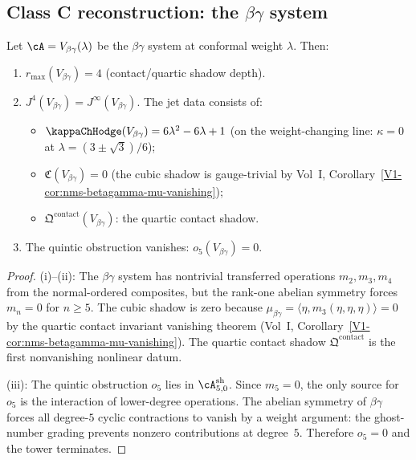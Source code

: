 \subsection{Class C reconstruction: the $\beta\gamma$ system}

\begin{theorem}
\label{thm:class-c-reconstruction}
Let $\cA = V_{\beta\gamma}(\lambda)$ be the $\beta\gamma$ system at conformal weight
$\lambda$. Then:
\begin{enumerate}[label=\textup{(\roman*)}]
\item $r_{\max}(V_{\beta\gamma}) = 4$ (contact/quartic shadow depth).
\item $J^4(V_{\beta\gamma}) = J^\infty(V_{\beta\gamma})$. The jet data consists of:
 \begin{itemize}
 \item $\kappaChHodge(V_{\beta\gamma}) = 6\lambda^2 - 6\lambda + 1$ (on the weight-changing
 line: $\kappa = 0$ at $\lambda = (3 \pm \sqrt{3})/6$);
 \item $\mathfrak{C}(V_{\beta\gamma}) = 0$ (the cubic shadow is gauge-trivial by
 Vol~I, Corollary~\ref*{V1-cor:nms-betagamma-mu-vanishing});
 \item $\mathfrak{Q}^{\mathrm{contact}}(V_{\beta\gamma})$: the quartic contact shadow.
 \end{itemize}
\item The quintic obstruction vanishes: $o_5(V_{\beta\gamma}) = 0$.
\end{enumerate}
\end{theorem}

\begin{proof}
(i)--(ii): The $\beta\gamma$ system has nontrivial transferred operations
$m_2, m_3, m_4$ from the normal-ordered composites, but the rank-one abelian symmetry
forces $m_n = 0$ for $n \geq 5$. The cubic shadow is zero because
$\mu_{\beta\gamma} = \langle \eta, m_3(\eta, \eta, \eta) \rangle = 0$ by the quartic
contact invariant vanishing theorem (Vol~I, Corollary~\ref*{V1-cor:nms-betagamma-mu-vanishing}).
The quartic contact shadow $\mathfrak{Q}^{\mathrm{contact}}$ is the first nonvanishing
nonlinear datum.

(iii): The quintic obstruction $o_5$ lies in $\cA^{\mathrm{sh}}_{5,0}$. Since
$m_5 = 0$, the only source for $o_5$ is the interaction of lower-degree operations.
The abelian symmetry of $\beta\gamma$ forces all degree-$5$ cyclic contractions to
vanish by a weight argument: the ghost-number grading prevents nonzero contributions
at degree~$5$. Therefore $o_5 = 0$ and the tower terminates.
\end{proof}

